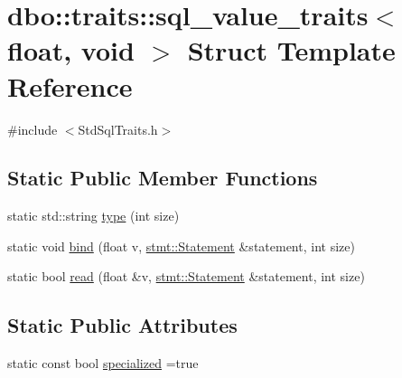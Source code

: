 \hypertarget{structdbo_1_1traits_1_1sql__value__traits_3_01float_00_01void_01_4}{\section{dbo\+:\+:traits\+:\+:sql\+\_\+value\+\_\+traits$<$ float, void $>$ Struct Template Reference}
\label{structdbo_1_1traits_1_1sql__value__traits_3_01float_00_01void_01_4}
}


{\ttfamily \#include $<$Std\+Sql\+Traits.\+h$>$}

\subsection*{Static Public Member Functions}
\begin{DoxyCompactItemize}
\item 
static std\+::string \hyperlink{structdbo_1_1traits_1_1sql__value__traits_3_01float_00_01void_01_4_af331ec88fbc0a93ea643b557b85996ea}{type} (int size)
\item 
static void \hyperlink{structdbo_1_1traits_1_1sql__value__traits_3_01float_00_01void_01_4_a4df8b2992a899fe00a71d4f5e7e4042d}{bind} (float v, \hyperlink{classdbo_1_1stmt_1_1_statement}{stmt\+::\+Statement} \&statement, int size)
\item 
static bool \hyperlink{structdbo_1_1traits_1_1sql__value__traits_3_01float_00_01void_01_4_a7366ecad146b0eae901f34fff9973dd6}{read} (float \&v, \hyperlink{classdbo_1_1stmt_1_1_statement}{stmt\+::\+Statement} \&statement, int size)
\end{DoxyCompactItemize}
\subsection*{Static Public Attributes}
\begin{DoxyCompactItemize}
\item 
static const bool \hyperlink{structdbo_1_1traits_1_1sql__value__traits_3_01float_00_01void_01_4_a9b693411503d1b7930349db153342216}{specialized} =true
\end{DoxyCompactItemize}


